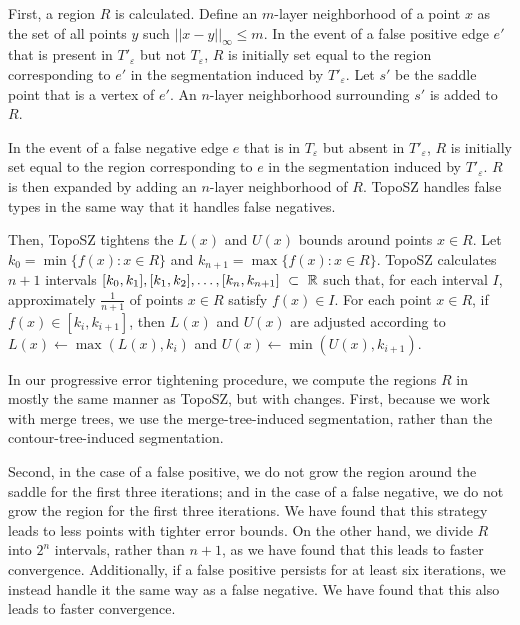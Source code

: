 First, a region $R$ is calculated. Define an $m$-layer neighborhood of a point $x$ as the set of all points $y$ such $||x-y||_\infty \leq m$. In the event of a false positive edge $e'$ that is present in $T'_\varepsilon$ but not $T_\varepsilon$, $R$ is initially set equal to the region corresponding to $e'$ in the segmentation induced by $T'_\varepsilon$. Let $s'$ be the saddle point that is a vertex of $e'$. An $n$-layer neighborhood surrounding $s'$ is added to $R$.

In the event of a false negative edge $e$ that is in $T_\varepsilon$ but absent in $T'_\varepsilon$, $R$ is initially set equal to the region corresponding to $e$ in the segmentation induced by $T'_\varepsilon$. $R$ is then expanded by adding an $n$-layer neighborhood of $R$. TopoSZ handles false types in the same way that it handles false negatives.

Then, TopoSZ tightens the $L(x)$ and $U(x)$ bounds around points $x \in R$. Let $k_0 = \min\{f(x) : x \in R\}$ and $k_{n+1} = \max\{ f(x) : x \in R \}$. TopoSZ calculates $n+1$ intervals $[k_0, k_1], [k_1,k_2], \ldots, [k_n,k_{n+1}]~\subset~\mathbb{R}$ such that, for each interval $I$, approximately $\frac{1}{n+1}$ of points $x \in R$ satisfy $f(x) \in I$. For each point $x \in R$, if $f(x) \in [k_i, k_{i+1}]$, then $L(x)$ and $U(x)$ are adjusted according to $L(x) \leftarrow \max(L(x), k_i)$ and $U(x) \leftarrow \min( U(x), k_{i+1})$.

In our progressive error tightening procedure, we compute the regions $R$ in mostly the same manner as TopoSZ, but with changes. First, because we work with merge trees, we use the merge-tree-induced segmentation, rather than the contour-tree-induced segmentation. 

Second, in the case of a false positive, we do not grow the region around the saddle for the first three iterations; and in the case of a false negative, we do not grow the region for the first three iterations. We have found that this strategy leads to less points with tighter error bounds. On the other hand, we divide $R$ into $2^n$ intervals, rather than $n+1$, as we have found that this leads to faster convergence. Additionally, if a false positive persists for at least six iterations, we instead handle it the same way as a false negative. We have found that this also leads to faster convergence.